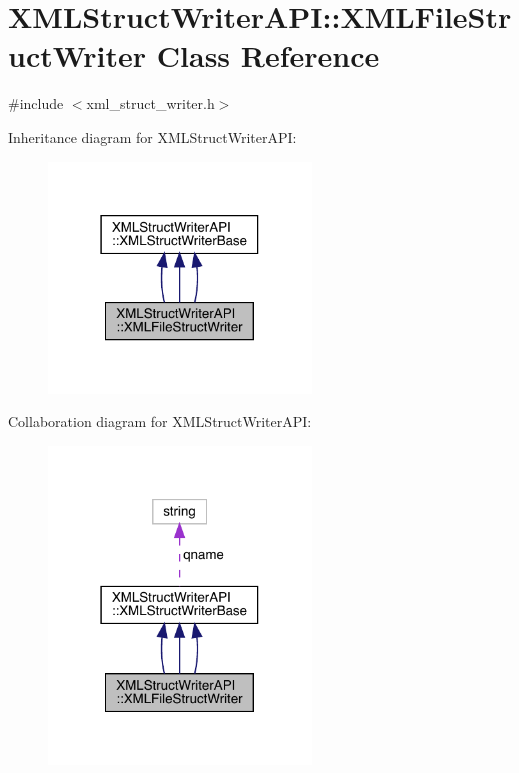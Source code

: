 \hypertarget{classXMLStructWriterAPI_1_1XMLFileStructWriter}{}\section{X\+M\+L\+Struct\+Writer\+A\+PI\+:\+:X\+M\+L\+File\+Struct\+Writer Class Reference}
\label{classXMLStructWriterAPI_1_1XMLFileStructWriter}


{\ttfamily \#include $<$xml\+\_\+struct\+\_\+writer.\+h$>$}



Inheritance diagram for X\+M\+L\+Struct\+Writer\+A\+PI\+:
\nopagebreak
\begin{figure}[H]
\begin{center}
\leavevmode
\includegraphics[width=198pt]{de/d04/classXMLStructWriterAPI_1_1XMLFileStructWriter__inherit__graph}
\end{center}
\end{figure}


Collaboration diagram for X\+M\+L\+Struct\+Writer\+A\+PI\+:
\nopagebreak
\begin{figure}[H]
\begin{center}
\leavevmode
\includegraphics[width=198pt]{d5/d3e/classXMLStructWriterAPI_1_1XMLFileStructWriter__coll__graph}
\end{center}
\end{figure}

